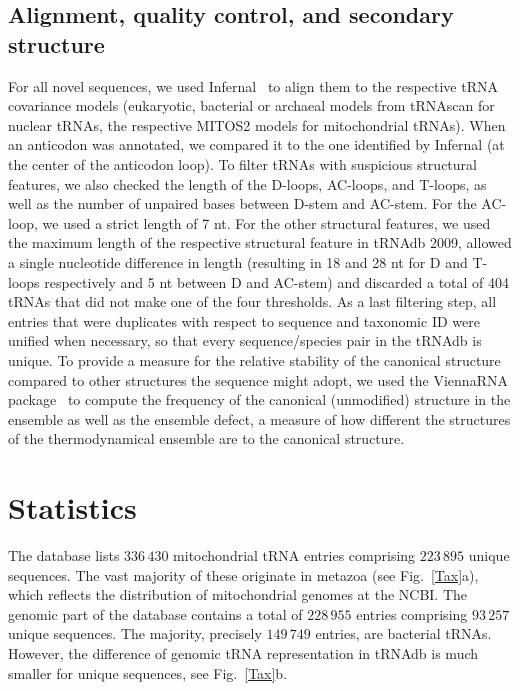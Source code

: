 \documentclass[unnumsec,webpdf,contemporary,large]{oup-authoring-template}
\newcommand{\TODO}[1]{\begingroup\color{red}#1\endgroup}
\begin{document}
\subsection{Alignment\TODO{, quality control, and secondary structure}}
For all novel sequences, we used Infernal~\cite{infernal} to align them to
the respective tRNA covariance models (eukaryotic, bacterial or archaeal
models from tRNAscan for nuclear tRNAs, the respective MITOS2 models for
mitochondrial tRNAs). When an anticodon was annotated, we compared it to
the one identified by Infernal (at the center of the anticodon loop). To
filter tRNAs with suspicious structural features, we also checked the
length of the D-loops, AC-loops, and T-loops, as well as the number of
unpaired bases between D-stem and AC-stem. For the AC-loop, we used a
strict length of 7 nt. For the other structural features, we used the
maximum length of the respective structural feature in tRNAdb 2009, allowed
a single nucleotide difference in length (resulting in 18 and 28 nt for D
and T-loops respectively and 5 nt between D and AC-stem) and discarded a
total of 404 tRNAs that did not make one of the four thresholds. As a last
filtering step, all entries that were duplicates with respect to sequence
and taxonomic ID were unified when necessary, so that every
sequence/species pair in the tRNAdb is unique.
\TODO{To provide a measure for the relative stability of the
  canonical structure compared to other structures the sequence might
  adopt, we used the ViennaRNA package~\cite{viennarna} to compute the
  frequency of the canonical (unmodified) structure in the ensemble as well
  as the ensemble defect, a measure of how different the structures of the
  thermodynamical ensemble are to the canonical structure.}

\section{Statistics}

The database lists $336\,430$ mitochondrial tRNA entries comprising
$223\,895$ unique sequences. The vast majority of these originate in
metazoa (see Fig.~\ref{Tax}a), which reflects the distribution of
mitochondrial genomes at the NCBI. The genomic part of the database
contains a total of $228\,955$ entries comprising $93\,257$ unique
sequences. The majority, precisely $149\,749$ entries, are bacterial
tRNAs. However, the difference of genomic tRNA representation in tRNAdb is
much smaller for unique sequences, see Fig.~\ref{Tax}b.
\end{document}
